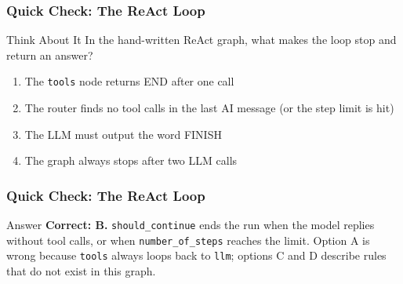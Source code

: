 
\begin{frame}[fragile]\frametitle{Quick Check: The ReAct Loop}
\begin{block}{Think About It}
In the hand-written ReAct graph, what makes the loop stop and return an answer?
\begin{enumerate}
  \item[A.] The \texttt{tools} node returns END after one call
  \item[B.] The router finds no tool calls in the last AI message (or the step limit is hit)
  \item[C.] The LLM must output the word FINISH
  \item[D.] The graph always stops after two LLM calls
\end{enumerate}
\end{block}
\end{frame}

\begin{frame}[fragile]\frametitle{Quick Check: The ReAct Loop}
\begin{block}{Answer}
\textbf{Correct: B.} \texttt{should\_continue} ends the run when the model replies without tool calls, or when \texttt{number\_of\_steps} reaches the limit. Option A is wrong because \texttt{tools} always loops back to \texttt{llm}; options C and D describe rules that do not exist in this graph.
\end{block}
\end{frame}

